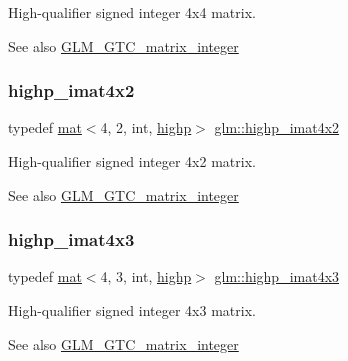 High-\/qualifier signed integer 4x4 matrix. \begin{DoxySeeAlso}{See also}
\mbox{\hyperlink{group__gtc__matrix__integer}{G\+L\+M\+\_\+\+G\+T\+C\+\_\+matrix\+\_\+integer}} 
\end{DoxySeeAlso}
\mbox{\label{group__gtc__matrix__integer_gac3bc64ec9129474635c6973f79c149a7}} 
\subsubsection{\texorpdfstring{highp\+\_\+imat4x2}{highp\_imat4x2}}
{\footnotesize\ttfamily typedef \mbox{\hyperlink{structglm_1_1mat}{mat}}$<$4, 2, int, \mbox{\hyperlink{namespaceglm_a36ed105b07c7746804d7fdc7cc90ff25ac6f7eab42eacbb10d59a58e95e362074}{highp}}$>$ \mbox{\hyperlink{group__gtc__matrix__integer_gac3bc64ec9129474635c6973f79c149a7}{glm\+::highp\+\_\+imat4x2}}}

High-\/qualifier signed integer 4x2 matrix. \begin{DoxySeeAlso}{See also}
\mbox{\hyperlink{group__gtc__matrix__integer}{G\+L\+M\+\_\+\+G\+T\+C\+\_\+matrix\+\_\+integer}} 
\end{DoxySeeAlso}
\mbox{\label{group__gtc__matrix__integer_ga03ddba7301f182bf5cb1e66a6aa43bcb}} 
\subsubsection{\texorpdfstring{highp\+\_\+imat4x3}{highp\_imat4x3}}
{\footnotesize\ttfamily typedef \mbox{\hyperlink{structglm_1_1mat}{mat}}$<$4, 3, int, \mbox{\hyperlink{namespaceglm_a36ed105b07c7746804d7fdc7cc90ff25ac6f7eab42eacbb10d59a58e95e362074}{highp}}$>$ \mbox{\hyperlink{group__gtc__matrix__integer_ga03ddba7301f182bf5cb1e66a6aa43bcb}{glm\+::highp\+\_\+imat4x3}}}

High-\/qualifier signed integer 4x3 matrix. \begin{DoxySeeAlso}{See also}
\mbox{\hyperlink{group__gtc__matrix__integer}{G\+L\+M\+\_\+\+G\+T\+C\+\_\+matrix\+\_\+integer}} 
\end{DoxySeeAlso}
\mbox{\label{group__gtc__matrix__integer_gaae7cdd2394ff80ecf1be6d78bfde629a}} 
